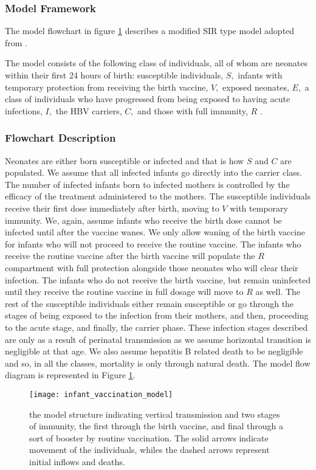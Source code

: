 \subsubsection{Model Framework}
The model flowchart in figure \ref{fig:flowchart} describes a modified SIR type model adopted from \cite{zou2010modeling}.

The model consists of the following class of individuals, all of whom are neonates within their first 24 hours of birth: susceptible individuals, $S,$ infants with temporary protection from receiving the birth vaccine, $V,$ exposed neonates, $E,$ a class of individuals who have progressed from being exposed to having acute infections, $I,$ the HBV carriers, $C,$ and those with full immunity, $R$ .

\subsubsection{Flowchart Description}
Neonates are either born susceptible or infected and that is how $S$ and $C$ are populated. We assume that all infected infants go directly into the carrier class. The number of infected infants born to infected mothers is controlled by the efficacy of the treatment administered to the mothers. The susceptible individuals receive their first dose immediately after birth, moving to $V$ with temporary immunity. We, again, assume infants who receive the birth dose cannot be infected until after the vaccine wanes. We only allow waning of the birth vaccine for infants who will not proceed to receive the routine vaccine. The infants who receive the routine vaccine after the birth vaccine will populate the $R$ compartment with full protection alongside those neonates who will clear their infection. The infants who do not receive the birth vaccine, but remain uninfected until they receive the routine vaccine in full dosage will move to $R$ as well. The rest of the susceptible individuals either remain susceptible or go through the stages of being exposed to the infection from their mothers, and then, proceeding to the acute stage, and finally, the carrier phase. These infection stages described are only as a result of perinatal transmission as we assume horizontal transition is negligible at that age. We also assume hepatitis B related death to be negligible and so, in all the classes, mortality is only through natural death. 
\clearpage 		
The model flow diagram is represented in Figure \ref{fig:flowchart}. 
\begin{figure}[h!]
	\texttt{[image: infant\_vaccination\_model]}
	\caption{the model structure indicating vertical transmission and two stages of immunity, the first through the birth vaccine, and final through a sort of booster by routine vaccination. The solid arrows indicate movement of the individuals, whiles the dashed arrows represent initial inflows and deaths.} \label{fig:flowchart}
\end{figure}

